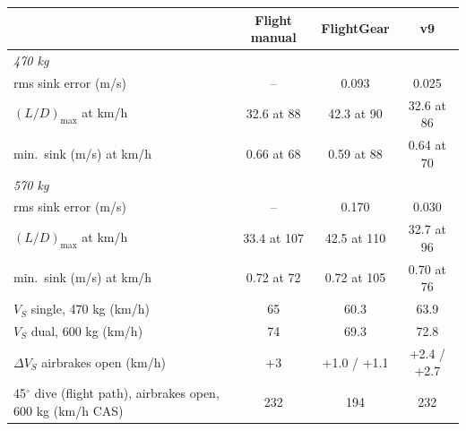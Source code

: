 \begin{tabular}{lccc}
\toprule
 & Flight manual & FlightGear & v9 \\
\midrule
\multicolumn{4}{l}{\emph{470 kg}} \\
\quad rms sink error (m/s) & -- & 0.093 & 0.025 \\
\quad $(L/D)_{\max}$ at km/h & 32.6 at 88 & 42.3 at 90 & 32.6 at 86 \\
\quad min.\ sink (m/s) at km/h & 0.66 at 68 & 0.59 at 88 & 0.64 at 70 \\
\multicolumn{4}{l}{\emph{570 kg}} \\
\quad rms sink error (m/s) & -- & 0.170 & 0.030 \\
\quad $(L/D)_{\max}$ at km/h & 33.4 at 107 & 42.5 at 110 & 32.7 at 96 \\
\quad min.\ sink (m/s) at km/h & 0.72 at 72 & 0.72 at 105 & 0.70 at 76 \\
\midrule
$V_S$ single, 470 kg (km/h) & 65 & 60.3 & 63.9 \\
$V_S$ dual, 600 kg (km/h) & 74 & 69.3 & 72.8 \\
$\Delta V_S$ airbrakes open (km/h) & +3 & +1.0 / +1.1 & +2.4 / +2.7 \\
45$^\circ$ dive (flight path), airbrakes open, 600 kg (km/h CAS) & 232 & 194 & 232 \\
\bottomrule
\end{tabular}
